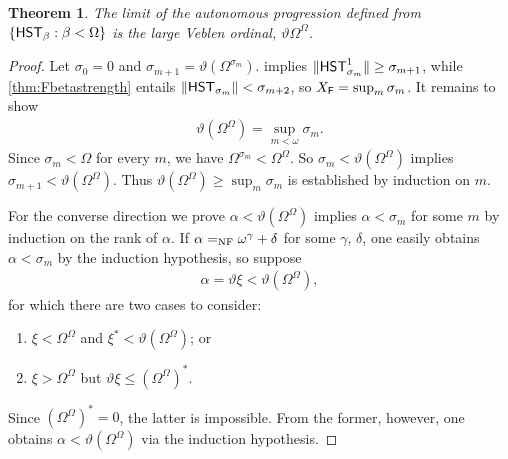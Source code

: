 \documentclass[UKenglish,cleveref,DIV=12]{scrartcl}
\newtheorem{theorem}{Theorem}[section]
\theoremstyle{definition}
\theoremstyle{definition}
\begin{document}
\begin{theorem}\label{thm:Fbauto}
 The limit of the autonomous progression defined from $\{\mathsf{HST}_\beta:\beta<\Omega\}$ is the large Veblen ordinal, $\vartheta\Omega^\Omega$.
\end{theorem}
\begin{proof}
Let $\sigma_0=0$ and $\sigma_{m+1}=\vartheta(\Omega^{\sigma_m})$.  implies $\lVert{\mathsf{HST}_{\sigma_m}^1}\rVert\ge\sigma_{m+1}$, while \cref{thm:Fbetastrength} entails $\lVert{\mathsf{HST}_{\sigma_m}}\rVert<\sigma_{m+2}$, so $X_{\mathsf{F}}=\sup_m\sigma_m$. It remains to show
\begin{align*}
 \vartheta(\Omega^\Omega)=\sup_{m<\omega}\sigma_m.
\end{align*}
Since ${\sigma_m}<\Omega$ for every $m$, we have $\Omega^{\sigma_m}<\Omega^\Omega$.
So $\sigma_m<\vartheta(\Omega^\Omega)$ implies
$\sigma_{m+1}<\vartheta(\Omega^\Omega)$. Thus
$\vartheta(\Omega^\Omega)\ge\sup_m\sigma_m$ is established by induction on $m$.

For the converse direction we prove $\alpha<\vartheta(\Omega^\Omega)$ implies
$\alpha<\sigma_m$ for some $m$ by induction on the rank of $\alpha$. If
$\alpha=_{\mathrm{NF}}\omega^\gamma+\delta$ for some $\gamma$, $\delta$, one easily obtains
$\alpha<\sigma_m$ by the induction hypothesis, so suppose
\begin{align*}
 \alpha=\vartheta\xi<\vartheta(\Omega^\Omega),
\end{align*}
for which there are two cases to consider:
\begin{enumerate}
 \item $\xi<\Omega^\Omega$ and $\xi^*<\vartheta(\Omega^\Omega)$; or
 \item $\xi>\Omega^\Omega$ but $\vartheta\xi\le(\Omega^\Omega)^*$.
\end{enumerate}
Since $(\Omega^\Omega)^*=0$, the latter is impossible. From the former, however, one obtains $\alpha<\vartheta(\Omega^\Omega)$ via the induction
hypothesis.
\end{proof}
\end{document}
